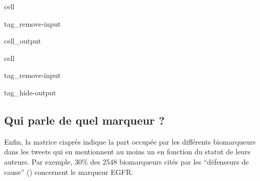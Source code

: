 \documentclass[letterpaper,10pt,english]{jupyterBook}
\begin{document}
\begin{sphinxuseclass}{cell}
\begin{sphinxuseclass}{tag_remove-input}\begin{sphinxVerbatimOutput}

\begin{sphinxuseclass}{cell_output}
\end{sphinxuseclass}\end{sphinxVerbatimOutput}

\end{sphinxuseclass}
\end{sphinxuseclass}
\begin{sphinxuseclass}{cell}
\begin{sphinxuseclass}{tag_remove-input}
\begin{sphinxuseclass}{tag_hide-output}
\end{sphinxuseclass}
\end{sphinxuseclass}
\end{sphinxuseclass}

\subsection{Qui parle de quel marqueur ?}
\label{\detokenize{analyse_preleminaire:qui-parle-de-quel-marqueur}}
\sphinxAtStartPar
Enfin, la matrice ci\sphinxhyphen{}après indique la part occupée par les différents biomarqueurs dans les tweets qui en mentionnent au moins un en fonction du statut de leurs auteurs. Par exemple, 30\% des 2548 biomarqueurs cités par les “défenseurs de cause” () concernent le marqueur EGFR.
\end{document}
